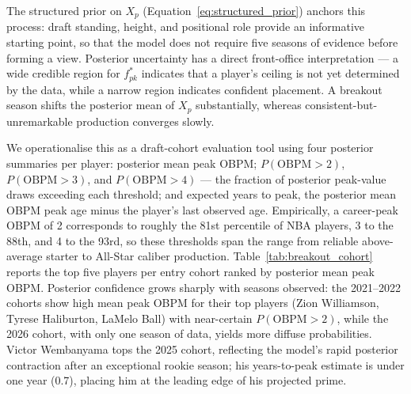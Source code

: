 \documentclass[aoas]{imsart}
\begin{document}
The structured prior on $X_p$ (Equation~\ref{eq:structured_prior}) anchors this process: draft standing, height, and positional role provide an informative starting point, so that the model does not require five seasons of evidence before forming a view.  Posterior uncertainty has a direct front-office interpretation --- a wide credible region for $f^*_{pk}$ indicates that a player's ceiling is not yet determined by the data, while a narrow region indicates confident placement.  A breakout season shifts the posterior mean of $X_p$ substantially, whereas consistent-but-unremarkable production converges slowly. 

We operationalise this as a draft-cohort evaluation tool using four posterior summaries per player: posterior mean peak OBPM; $P(\text{OBPM}{>}2)$, $P(\text{OBPM}{>}3)$, and $P(\text{OBPM}{>}4)$ — the fraction of posterior peak-value draws exceeding each threshold; and expected years to peak, the posterior mean OBPM peak age minus the player's last observed age.  Empirically, a career-peak OBPM of 2 corresponds to roughly the 81st percentile of NBA players, 3 to the 88th, and 4 to the 93rd, so these thresholds span the range from reliable above-average starter to All-Star caliber production.  Table~\ref{tab:breakout_cohort} reports the top five players per entry cohort ranked by posterior mean peak OBPM.  Posterior confidence grows sharply with seasons observed: the 2021--2022 cohorts show high mean peak OBPM for their top players (Zion Williamson, Tyrese Haliburton, LaMelo Ball) with near-certain $P(\text{OBPM}{>}2)$, while the 2026 cohort, with only one season of data, yields more diffuse probabilities.  Victor Wembanyama tops the 2025 cohort, reflecting the model's rapid posterior contraction after an exceptional rookie season; his years-to-peak estimate is under one year (0.7), placing him at the leading edge of his projected prime.  



\end{document}
